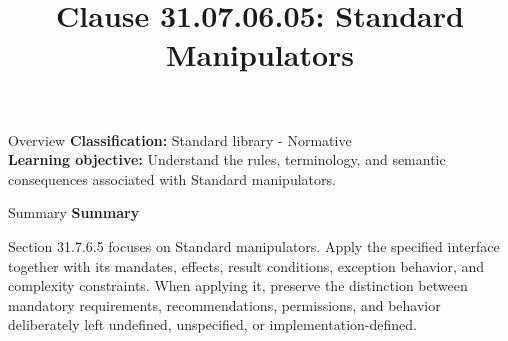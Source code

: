 \documentclass[10pt,letterpaper]{article}
\title{Clause 31.07.06.05: Standard Manipulators}
\author{}
\date{}
\begin{document}
\maketitle
\begin{CornellOverviewBox}{Overview}
\textbf{Classification:} Standard library - Normative\\[2pt]
\textbf{Learning objective:} Understand the rules, terminology, and semantic consequences associated with Standard manipulators.
\end{CornellOverviewBox}\begin{CornellSummaryBox}{Summary}
{\sffamily\bfseries\color{Accent} Summary}\par\vspace{3pt}Section 31.7.6.5 focuses on Standard manipulators. Apply the specified interface together with its mandates, effects, result conditions, exception behavior, and complexity constraints. When applying it, preserve the distinction between mandatory requirements, recommendations, permissions, and behavior deliberately left undefined, unspecified, or implementation-defined.
\end{CornellSummaryBox}
\end{document}
